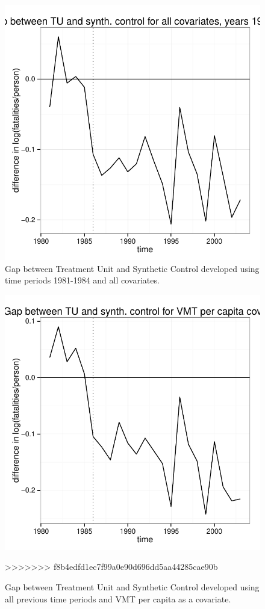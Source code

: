 \documentclass[letterpaper, 12pt]{article}
\begin{document}
\begin{figure}[htbp]
\begin{center}
\includegraphics{img-gap-full1984.pdf}
\caption{Gap between Treatment Unit and Synthetic Control developed using time periods 1981-1984 and all covariates.}
\label{fig:c12}
\end{center}
\end{figure}

\begin{figure}[htbp]
\begin{center}
\includegraphics{img-gap-vmt.pdf}
\caption{Gap between Treatment Unit and Synthetic Control developed using all previous time periods and VMT per capita as a covariate.}
\label{fig:c13}
\end{center}
>>>>>>> f8b4edfd1ec7f99a0e90d696dd5aa44285cae90b
\end{figure}
\end{document}
